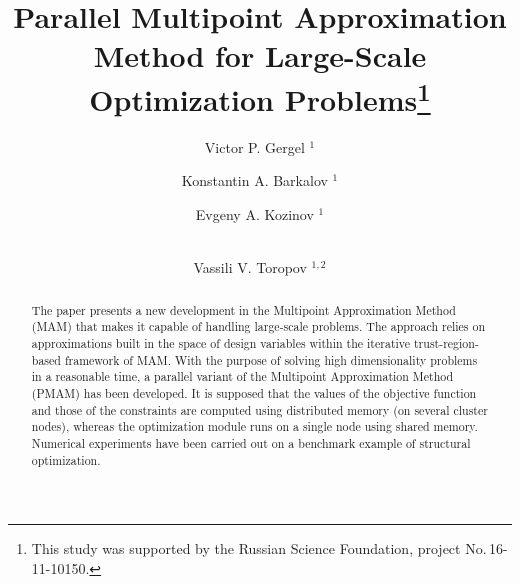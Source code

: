 \documentclass[a4paper]{llncs}
\begin{document}
\mainmatter  %

\title{Parallel Multipoint Approximation Method for Large-Scale Optimization Problems\thanks{This
study was supported by the Russian Science Foundation, project
No.\,16-11-10150.}}


\author{Victor P. Gergel%
$^1$ \and
Konstantin A. Barkalov%
$^1$ \and
Evgeny A. Kozinov%
$^1$ \and \\
Vassili V. Toropov%
$^{1,2}$
}
%


%
%

\maketitle

\begin{abstract}
The paper presents a new development in the Multipoint Approximation Method
(MAM) that makes it capable of handling large-scale problems. The approach
relies on approximations built in the space of design variables within the
iterative trust-region-based framework of MAM. With the purpose of solving high
dimensionality problems in a reasonable time, a parallel variant of the
Multipoint Approximation Method (PMAM) has been developed. It is supposed that
the values of the objective function and those of the constraints are computed
using distributed memory (on several cluster nodes), whereas the optimization
module runs on a single node using shared memory. Numerical experiments have
been carried out on a benchmark example of structural optimization.

\end{abstract}
\end{document}
